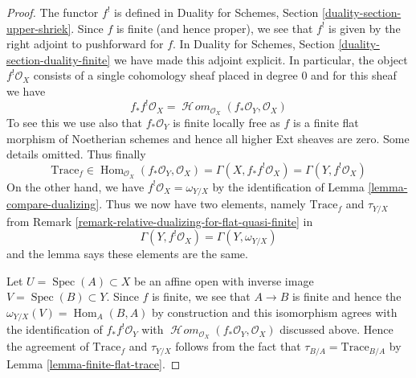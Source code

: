 \documentclass[10pt,a4paper]{amsart}
\theoremstyle{plain}
\theoremstyle{definition}
\theoremstyle{remark}
\numberwithin{equation}{subsection}
\def\Spec{\mathop{\mathrm{Spec}}}
\def\Hom{\mathop{\mathrm{Hom}}\nolimits}
\def\SheafHom{\mathop{\mathcal{H}\!\mathit{om}}\nolimits}
\begin{document}
\begin{proof}
The functor $f^!$ is defined in 
Duality for Schemes, Section \ref{duality-section-upper-shriek}.
Since $f$ is finite (and hence proper), we see that $f^!$ is given by
the right adjoint to pushforward for $f$. In
Duality for Schemes, Section \ref{duality-section-duality-finite}
we have made this adjoint explicit. In particular,
the object $f^!\mathcal{O}_X$ consists of a single
cohomology sheaf placed in degree $0$ and for this sheaf we have
$$
f_*f^!\mathcal{O}_X =
\SheafHom_{\mathcal{O}_X}(f_*\mathcal{O}_Y, \mathcal{O}_X)
$$
To see this we use also that $f_*\mathcal{O}_Y$ is finite locally free
as $f$ is a finite flat morphism of Noetherian schemes
and hence all higher Ext sheaves are zero. Some details omitted.
Thus finally
$$
\text{Trace}_f \in
\Hom_{\mathcal{O}_X}(f_*\mathcal{O}_Y, \mathcal{O}_X) =
\Gamma(X, f_*f^!\mathcal{O}_X) =
\Gamma(Y, f^!\mathcal{O}_X)
$$
On the other hand, we have $f^!\mathcal{O}_X = \omega_{Y/X}$
by the identification of Lemma \ref{lemma-compare-dualizing}.
Thus we now have two elements, namely $\text{Trace}_f$
and $\tau_{Y/X}$ from
Remark \ref{remark-relative-dualizing-for-flat-quasi-finite} in
$$
\Gamma(Y, f^!\mathcal{O}_X) = \Gamma(Y, \omega_{Y/X})
$$
and the lemma says these elements are the same.

\medskip\noindent
Let $U = \Spec(A) \subset X$ be an affine open with inverse image
$V = \Spec(B) \subset Y$. Since $f$ is finite, we see that
$A \to B$ is finite and hence the $\omega_{Y/X}(V) = \Hom_A(B,A)$
by construction and this isomorphism agrees with the identification
of $f_*f^!\mathcal{O}_Y$ with
$\SheafHom_{\mathcal{O}_X}(f_*\mathcal{O}_Y, \mathcal{O}_X)$ discussed
above. Hence the agreement of $\text{Trace}_f$ and $\tau_{Y/X}$
follows from the fact that $\tau_{B/A} = \text{Trace}_{B/A}$
by Lemma \ref{lemma-finite-flat-trace}.
\end{proof}
\end{document}
